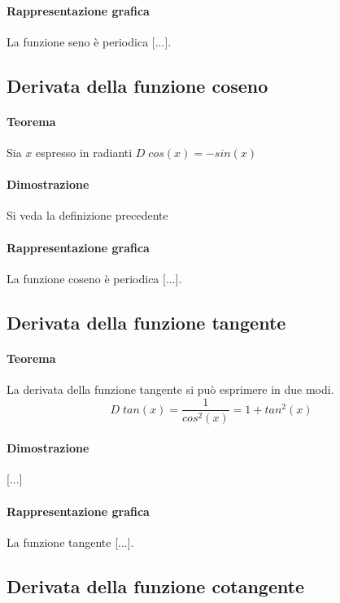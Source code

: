 \documentclass[a4paper,14pt]{extarticle}
\begin{document}
\paragraph{Rappresentazione grafica \\}
La funzione seno è periodica [...].

\subsection{Derivata della funzione coseno}
\paragraph{Teorema \\} Sia $x$ espresso in radianti $D\;cos(x) = -sin(x)$
\paragraph{Dimostrazione \\} Si veda la definizione precedente
\paragraph{Rappresentazione grafica \\}
La funzione coseno è periodica [...].

\subsection{Derivata della funzione tangente}
\paragraph{Teorema \\} La derivata della funzione tangente si può esprimere in due modi. \large \[ D\;tan(x) = \frac{1}{cos^2(x)} = 1+tan^2(x) \] \normalsize
\paragraph{Dimostrazione \\} [...]
\paragraph{Rappresentazione grafica \\}
La funzione tangente [...].

\subsection{Derivata della funzione cotangente}
\end{document}
